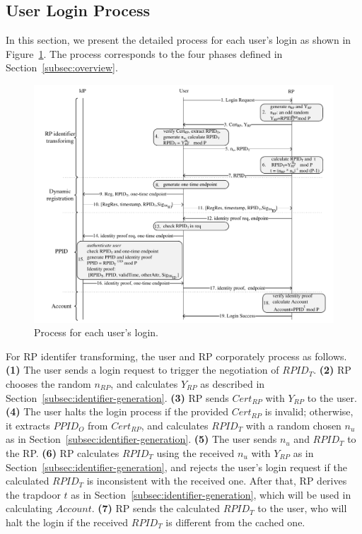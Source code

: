 \subsection{User Login Process}
\label{sebsec:loginprocess}
In this section, we present the detailed process for each user's login as shown in Figure~\ref{fig:process}. The process corresponds to the four phases defined in Section~\ref{subsec:overview}. 

\begin{figure}
  \centering
  \includegraphics[width=\linewidth]{fig/process.pdf}
  \caption{Process for each user's login.}
  \label{fig:process}
\end{figure}

For RP identifer transforming, the user and RP corporately process as follows. \textbf{(1)} The user sends a login request to trigger the negotiation of $RPID_T$. \textbf{(2)} RP chooses the random $n_{RP}$, and calculates $Y_{RP}$ as described in Section~\ref{subsec:identifier-generation}. \textbf{(3)} RP sends $Cert_{RP}$ with $Y_{RP}$ to the user.  \textbf{(4)} The user halts the login process if the provided $Cert_{RP}$ is invalid; otherwise, it extracts $PPID_O$ from $Cert_{RP}$, and calculates $RPID_T$ with a random chosen $n_u$ as in Section~\ref{subsec:identifier-generation}. \textbf{(5)} The user sends $n_u$ and $RPID_T$ to the RP. \textbf{(6)} RP calculates $RPID_T$ using the received $n_u$ with $Y_{RP}$ as in Section~\ref{subsec:identifier-generation}, and rejects the user's login request if the calculated $RPID_T$ is inconsistent with the received one. After that, RP derives the trapdoor $t$ as in Section~\ref{subsec:identifier-generation}, which will be used in calculating $Account$. \textbf{(7)} RP sends the calculated $RPID_T$ to the user, who will halt the login if the received $RPID_T$ is different from the cached one.

